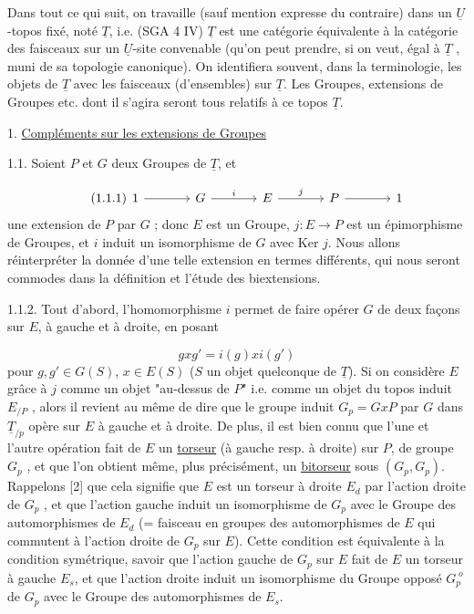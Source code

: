 Dans tout ce qui suit, on travaille (sauf mention expresse du contraire) dans un $\underline{U}$-topos fixé, noté $\underline{T}$, i.e. (SGA 4 IV) $\underline{T}$ est une catégorie équivalente à la catégorie des faisceaux sur un $\underline{U}$-site convenable (qu'on peut prendre, si on veut, égal à $\underline{T}$ , muni de sa topologie canonique). On identifiera souvent, dans la terminologie, les objets de $\underline{T}$ avec les faisceaux (d'ensembles) sur $\underline{T}$. Les Groupes, extensions de Groupes etc. dont il s'agira seront tous relatifs à ce topos $\underline{T}$.


1. \underline{Compléments sur les extensions de Groupes}

1.1.   Soient $P$ et $G$ deux Groupes de $\underline{T}$, et

\begin{equation}\tag{1.1.1}
\begin{tikzcd}[column sep=large]
1 \arrow[r] & G \arrow[r, "i"] & E \arrow[r, "j"] & P \arrow[r] & 1
\end{tikzcd}
\end{equation}
une extension de $P$ par $G$ ; donc $E$ est un Groupe, $j : E \longrightarrow P$ est un épimorphisme de Groupes, et $i$ induit un isomorphisme de $G$ avec Ker $j$. Nous allons réinterpréter la donnée d'une telle extension en termes différents, qui nous seront commodes dans la définition et l'étude des biextensions.



1.1.2.  Tout d'abord, l'homomorphisme $i$ permet de faire opérer $G$ de deux façons sur $E$, à gauche et à droite, en posant

\begin{equation*}
gxg' = i(g)xi(g')
\end{equation*}
pour $g,g' \in G(S)$, $x \in E(S)$ ($S$ un objet quelconque de $\underline{T}$). Si on considère $E$ grâce à $j$ comme un objet "au-dessus de $P$" i.e. comme un objet du topos induit $E_{/P}$ , alors il revient au même de dire que le groupe induit $G_p = GxP$ par $G$ dans $\underline{T}_{/p}$ opère sur $E$ à gauche et à droite. De plus, il est bien connu que l'une et l'autre opération fait de $E$ un \underline{torseur} (à gauche resp. à droite) sur $P$, de groupe $G_p$ , et que l'on obtient même, plus précisément, un \underline{bitorseur} sous $(G_p,G_p)$. Rappelons [2] que cela signifie que $E$ est un torseur à droite $E_d$ par l'action droite de $G_p$ , et que l'action gauche induit un isomorphisme de $G_p$ avec le Groupe des automorphismes de $E_d$ (= faisceau en groupes des automorphismes de $E$ qui commutent à l'action droite de $G_p$ sur $E$). Cette condition est équivalente à la condition symétrique, savoir que l'action gauche de $G_p$ sur $E$ fait de $E$ un torseur à gauche $E_s$, et que l'action droite induit un isomorphisme du Groupe opposé $G_p^{\;o}$ de $G_p$ avec le Groupe des automorphismes de $E_s$.

